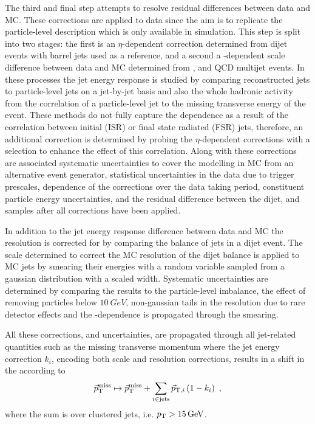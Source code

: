 The third and final step attempts to resolve residual differences between data
and MC. These corrections are applied to data since the aim is to replicate
the particle-level description which is only available in simulation. This
step is split into two stages: the first is an $\eta$-dependent correction
determined from dijet events with barrel jets used as a reference, and a
second a \pt-dependent scale difference between data and MC determined from
\IDYllj, \Igj and QCD multijet events. In these processes the jet energy
response is studied by comparing reconstructed jets to particle-level jets on
a jet-by-jet basis and also the whole hadronic activity from the correlation
of a particle-level jet to the missing transverse energy of the event. These
methods do not fully capture the dependence as a result of the correlation
between initial (ISR) or final state radiated (FSR) jets, therefore, an
additional correction is determined by probing the $\eta$-dependent
corrections with a selection to enhance the effect of this correlation. Along
with these corrections are associated systematic uncertainties to cover the
modelling in MC from an alternative event generator, statistical uncertainties
in the data due to trigger prescales, dependence of the corrections over the
data taking period, constituent particle energy uncertainties, and the
residual difference between the dijet, \Igj and \IDYllj samples after all
corrections have been applied.

In addition to the jet energy response difference between data and MC the
resolution is corrected for by comparing the balance of jets in a dijet event.
The scale determined to correct the MC resolution of the dijet balance is
applied to MC jets by smearing their energies with a random variable sampled
from a gaussian distribution with a scaled width. Systematic uncertainties
are determined by comparing the results to the particle-level imbalance, the
effect of removing particles below $\SI{10}{GeV}$, non-gaussian tails in the
resolution due to rare detector effects and the \pt-dependence is propagated
through the smearing.

All these corrections, and uncertainties, are propagated through all
jet-related quantities such as the missing transverse momentum where the jet
energy correction $k_i$, encoding both scale and resolution corrections,
results in a shift in the \ptmiss according to
%
\begin{equation}
    \vec{p}_{\text{T}}^{\mathrm{miss}} \mapsto \vec{p}_{\text{T}}^{\mathrm{miss}} + \sum_{i\in\mathrm{jets}}\vec{p}_{\mathrm{T},i} \left( 1 - k_i \right)\ ,
\end{equation}
%
where the sum is over clustered jets, i.e. ${p_{\text{T}}>\SI{15}{GeV}}$. 


